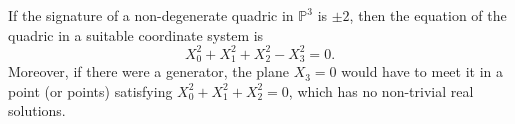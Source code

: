 If the signature of a non-degenerate quadric in $\mathbb{P}^3$ is $\pm 2$, then the equation of the quadric in a suitable coordinate system is
$$X_0^2 + X_1^2 + X_2^2 - X_3^2 = 0.$$
Moreover, if there were a generator, the plane $X_3 = 0$ would have to meet it in a point (or points) satisfying $X_0^2 + X_1^2 + X_2^2 = 0$, which has no non-trivial real solutions.
